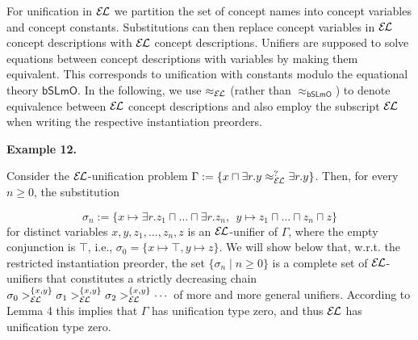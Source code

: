  
For unification in $\mathcal{E\mkern-1.618muL}$ we partition the set of concept names into concept variables and concept constants. Substitutions can then replace concept variables in $\mathcal{E\mkern-1.618muL}$ concept descriptions with $\mathcal{E\mkern-1.618muL}$ concept descriptions. Unifiers are supposed to solve equations between concept descriptions with variables by making them equivalent. This corresponds to unification with constants modulo the equational theory $\mathsf{bSLmO}$. In the following, we use $\approx_{\mathcal{E\mkern-1.618muL}}$ (rather than $\approx_{\mathsf{bSLmO}}$) to denote equivalence between $\mathcal{E\mkern-1.618muL}$ concept descriptions and also employ the subscript $\mathcal{E\mkern-1.618muL}$ when writing the respective instantiation preorders.\par
 
 
 
\par\medskip\noindent\textbf{Example 12.}\par
 
 
Consider the $\mathcal{E\mkern-1.618muL}$-unification problem $\Gamma:=\{x\sqcap\exists r.y\approx_{\mathcal{E\mkern-1.618muL}}^{?}\exists r.y\}$. Then, for every $n\geq 0$, the substitution\par
    \[\sigma_{n}:=\{x\mapsto\exists r.z_{1}\sqcap\ldots\sqcap\exists r.z_{n},\ \ y%
\mapsto z_{1}\sqcap\ldots\sqcap z_{n}\sqcap z\}\]    
for distinct variables $x,y,z_{1},\ldots,z_{n},z$ is an $\mathcal{E\mkern-1.618muL}$-unifier of $\Gamma$, where the empty conjunction is $\top$, i.e., $\sigma_{0}=\{x\mapsto\top,y\mapsto z\}$. We will show below that, w.r.t. the restricted instantiation preorder, the set $\{\sigma_{n}\mid n\geq 0\}$ is a complete set of $\mathcal{E\mkern-1.618muL}$-unifiers that constitutes a strictly decreasing chain $\sigma_{0}>_{\mathcal{E\mkern-1.618muL}}^{\{x,y\}}\sigma_{1}>_{\mathcal{E%
\mkern-1.618muL}}^{\{x,y\}}\sigma_{2}>_{\mathcal{E\mkern-1.618muL}}^{\{x,y\}}\cdots$ of more and more general unifiers. According to Lemma 4 this implies that $\Gamma$ has unification type zero, and thus $\mathcal{E\mkern-1.618muL}$ has unification type zero.\par
 
 
 
